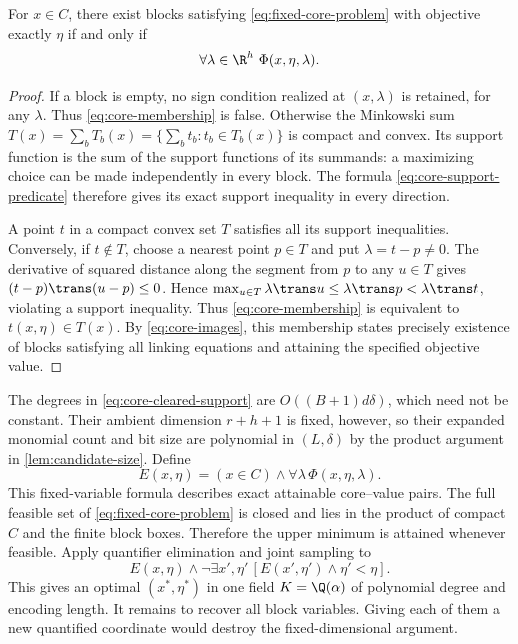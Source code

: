 \begin{lemma}\label{lem:core-support-membership}
For $x\in C$, there exist blocks satisfying
\eqref{eq:fixed-core-problem} with objective exactly $\eta$ if and only if
\begin{equation}\label{eq:core-membership}
                           \forall\lambda\in\R^h\ \Phi(x,\eta,\lambda).
\end{equation}
\end{lemma}
\begin{proof}
If a block is empty, no sign condition realized at $(x,\lambda)$ is
retained, for any $\lambda$. Thus \eqref{eq:core-membership} is false.
Otherwise the Minkowski sum
$T(x)=\sum_bT_b(x)=\{\sum_b t_b:t_b\in T_b(x)\}$ is compact and
convex. Its support function is the sum of the support functions of its
summands: a maximizing choice can be made independently in every block.
The formula \eqref{eq:core-support-predicate} therefore gives its exact
support inequality in every direction.

A point $t$ in a compact convex set $T$ satisfies all its support
inequalities. Conversely, if $t\notin T$, choose a nearest point
$p\in T$ and put $\lambda=t-p\ne0$. The derivative of squared
distance along the segment from $p$ to any $u\in T$ gives
$(t-p)\trans(u-p)\le0$. Hence
$\max_{u\in T}\lambda\trans u\le\lambda\trans p
<\lambda\trans t$, violating a support inequality.
Thus \eqref{eq:core-membership} is equivalent to $t(x,\eta)\in T(x)$.
By \eqref{eq:core-images}, this membership states precisely existence
of blocks satisfying all linking equations and attaining the specified
objective value.
\end{proof}

The degrees in \eqref{eq:core-cleared-support} are
$O((B+1)d\delta)$, which need not be constant. Their ambient dimension
$r+h+1$ is fixed, however, so their expanded monomial count and bit size
are polynomial in $(L,\delta)$ by the product argument in
\cref{lem:candidate-size}. Define
\[
 E(x,\eta)=(x\in C)\wedge\forall\lambda\,\Phi(x,\eta,\lambda).
\]
This fixed-variable formula describes exact attainable core--value
pairs. The full feasible set of \eqref{eq:fixed-core-problem} is closed
and lies in the product of compact $C$ and the finite block boxes.
Therefore the upper minimum is attained whenever feasible. Apply
quantifier elimination and joint sampling to
\begin{equation}\label{eq:core-joint-optimum}
 E(x,\eta)\wedge
       \neg\exists x',\eta'\,[E(x',\eta')\wedge\eta'<\eta].
\end{equation}
This gives an optimal $(x^*,\eta^*)$ in one field
$K=\Q(\alpha)$ of polynomial degree and encoding length.
It remains to recover all block variables. Giving each of them a new
quantified coordinate would destroy the fixed-dimensional argument.

